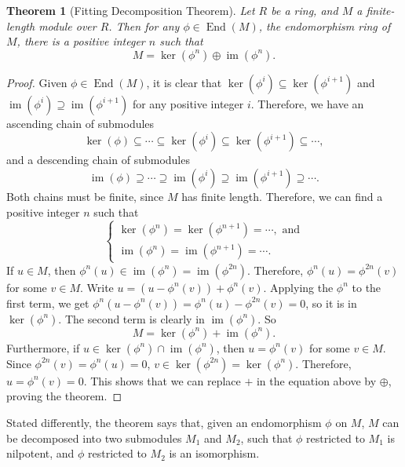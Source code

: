 \documentclass[12pt]{article}
\newtheorem{thm}{Theorem}
\begin{document}

\begin{thm}[Fitting Decomposition Theorem]  Let $R$ be a ring, and $M$ a finite-length module over $R$.  Then for any $\phi \in \operatorname{End}(M)$, the endomorphism ring of $M$, there is a positive integer $n$ such that $$M=\ker(\phi^n)\oplus \operatorname{im}(\phi^n).$$ \end{thm}
\begin{proof}
Given $\phi\in \operatorname{End}(M)$, it is clear that $\ker(\phi^i)\subseteq \ker(\phi^{i+1})$ and $\operatorname{im}(\phi^i)\supseteq \operatorname{im}(\phi^{i+1})$ for any positive integer $i$.  Therefore, we have an ascending chain of submodules $$\ker(\phi)\subseteq \cdots \subseteq \ker(\phi^i)\subseteq \ker(\phi^{i+1}) \subseteq \cdots,$$ and a descending chain of submodules $$\operatorname{im}(\phi)\supseteq \cdots \supseteq \operatorname{im}(\phi^i)\supseteq \operatorname{im}(\phi^{i+1}) \supseteq \cdots.$$
Both chains must be finite, since $M$ has finite length.  Therefore, we can find a positive integer $n$ such that 
\begin{displaymath}
\left\{
\begin{array}{l}
\ker(\phi^n)=\ker(\phi^{n+1})=\cdots, \mbox{ and}  \\
\operatorname{im}(\phi^n)= \operatorname{im}(\phi^{n+1}) =\cdots.
\end{array}
\right.
\end{displaymath}
If $u\in M$, then $\phi^n(u)\in \operatorname{im}(\phi^n)=\operatorname{im}(\phi^{2n})$.  Therefore, $\phi^n(u)=\phi^{2n}(v)$ for some $v\in M$.  Write $u=(u-\phi^n(v))+\phi^n(v)$.  Applying the $\phi^n$ to the first term, we get $\phi^n(u-\phi^n(v))=\phi^n(u)-\phi^{2n}(v)=0$, so it is in $\ker(\phi^n)$.  The second term is clearly in $\operatorname{im}(\phi^n)$.  So $$M=\ker(\phi^n)+\operatorname{im}(\phi^n).$$  Furthermore, if $u\in \ker(\phi^n)\cap \operatorname{im}(\phi^n)$, then $u=\phi^n(v)$ for some $v\in M$.  Since $\phi^{2n}(v)=\phi^n(u)=0$, $v\in \ker(\phi^{2n})=\ker(\phi^n)$.  Therefore, $u=\phi^n(v)=0$.  This shows that we can replace $+$ in the equation above by $\oplus$, proving the theorem.
\end{proof}

Stated differently, the theorem says that, given an endomorphism $\phi$ on $M$, $M$ can be decomposed into two submodules $M_1$ and $M_2$, such that $\phi$ restricted to $M_1$ is nilpotent, and $\phi$ restricted to $M_2$ is an isomorphism.
\end{document}
